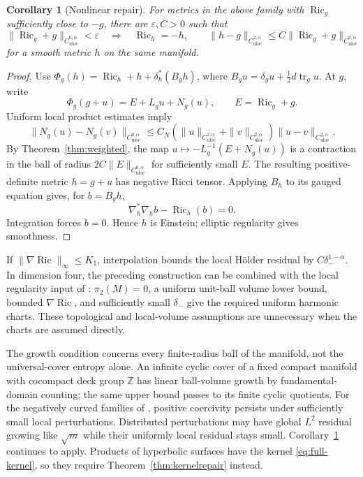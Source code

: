 \documentclass[11pt,a4paper]{article}
\newtheorem{corollary}[theorem]{Corollary}
\theoremstyle{definition}\newtheorem{definition}[theorem]{Definition}
\theoremstyle{remark}\newtheorem{remark}[theorem]{Remark}
\DeclareMathOperator{\Ric}{Ric}
\DeclareMathOperator{\tr}{tr}
\newcommand{\Z}{\mathbb Z}
\newcommand{\uloc}{\mathrm{uloc}}
\begin{document}
\begin{corollary}[Nonlinear repair]\label{cor:repair}
For metrics in the above family with $\Ric_g$ sufficiently close to $-g$, there are $\varepsilon,C>0$ such that
\[
 \|\Ric_g+g\|_{C^{0,\alpha}_{\uloc}}<\varepsilon
 \quad\Longrightarrow\quad
 \Ric_h=-h,\qquad
 \|h-g\|_{C^{2,\alpha}_{\uloc}}
                \le C\|\Ric_g+g\|_{C^{0,\alpha}_{\uloc}}
\]
for a smooth metric $h$ on the same manifold.
\end{corollary}
\begin{proof}
Use $\Phi_g(h)=\Ric_h+h+\delta_h^*(B_gh)$, where $B_gu=\delta_gu+\tfrac12d\tr_gu$. At $g$, write
\[
 \Phi_g(g+u)=E+L_gu+N_g(u),\qquad E=\Ric_g+g.
\]
Uniform local product estimates imply
\[
 \|N_g(u)-N_g(v)\|_{C^{0,\alpha}_{\uloc}}
 \le C_N(\|u\|_{C^{2,\alpha}_{\uloc}}+\|v\|_{C^{2,\alpha}_{\uloc}})
                         \|u-v\|_{C^{2,\alpha}_{\uloc}}.
\]
By Theorem~\ref{thm:weighted}, the map $u\mapsto-L_g^{-1}(E+N_g(u))$ is a contraction in the ball of radius $2C\|E\|_{C^{0,\alpha}_{\uloc}}$ for sufficiently small $E$. The resulting positive-definite metric $h=g+u$ has negative Ricci tensor. Applying $B_h$ to its gauged equation gives, for $b=B_gh$,
\[
 \nabla_h^*\nabla_hb-\Ric_h(b)=0.
\]
Integration forces $b=0$. Hence $h$ is Einstein; elliptic regularity gives smoothness.
\end{proof}
If $\|\nabla\Ric\|_\infty\le K_1$, interpolation bounds the local H\"older residual by $C\delta_-^{1-\alpha}$. In dimension four, the preceding construction can be combined with the local regularity input of \cite{source-local}: $\pi_2(M)=0$, a uniform unit-ball volume lower bound, bounded $\nabla\Ric$, and sufficiently small $\delta_-$ give the required uniform harmonic charts. These topological and local-volume assumptions are unnecessary when the charts are assumed directly.

The growth condition concerns every finite-radius ball of the manifold, not the universal-cover entropy alone. An infinite cyclic cover of a fixed compact manifold with cocompact deck group $\Z$ has linear ball-volume growth by fundamental-domain counting; the same upper bound passes to its finite cyclic quotients. For the negatively curved families of \cite{source-local}, positive coercivity persists under sufficiently small local perturbations. Distributed perturbations may have global $L^2$ residual growing like $\sqrt m$ while their uniformly local residual stays small. Corollary~\ref{cor:repair} continues to apply. Products of hyperbolic surfaces have the kernel \eqref{eq:full-kernel}, so they require Theorem~\ref{thm:kernelrepair} instead.
\end{document}
